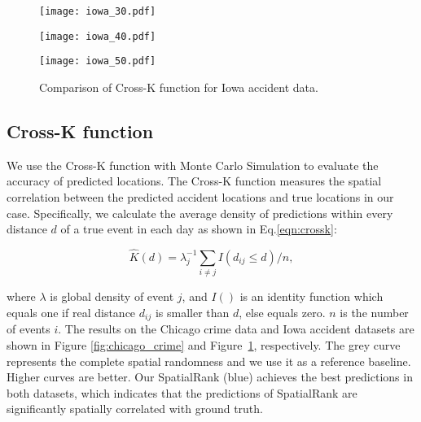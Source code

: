 \documentclass{article}
\begin{document}
{\begin{figure}
\centering
\begin{minipage}[c]{0.3\textwidth}
\centering\texttt{[image: iowa\_30.pdf]}
\end{minipage}
\begin{minipage}[c]{0.3\textwidth}
\centering\texttt{[image: iowa\_40.pdf]}
\end{minipage}
\begin{minipage}[c]{0.3\textwidth}
\centering\texttt{[image: iowa\_50.pdf]}
\end{minipage}
\caption{Comparison of Cross-K function for Iowa accident data.}
\label{fig:iowa}
\vspace{-2mm}
\end{figure}

\subsection{Cross-K function}

We use the Cross-K function\cite{doi:https://doi.org/10.1002/9781118445112.stat07751} with Monte Carlo Simulation\cite{TaoRan2019FCKa} to evaluate the accuracy of predicted locations. The Cross-K function measures the spatial correlation between the predicted accident locations and true locations in our case. Specifically, we calculate the average density of predictions within every distance $d$ of a true event in each day as shown in Eq.\ref{eqn:crossk}:


\vspace{-0.1in}
\begin{equation} \label{eqn:crossk}
\hat{K}(d) =  \lambda_j^{-1}\sum_{i \neq j}I(d_{ij} \leq d)/n,
\end{equation}

\vspace{-0.1in}
\noindent where $\lambda$ is global density of event $j$, and $I()$ is an identity function which equals one if real distance $d_{ij}$ is smaller than $d$, else equals zero. $n$ is the number of events $i$. The results on the Chicago crime data and Iowa accident datasets are shown in Figure \ref{fig:chicago_crime} and Figure~\ref{fig:iowa}, respectively. The grey curve represents the complete spatial randomness and we use it as a reference baseline. Higher curves are better. Our SpatialRank (blue) achieves the best predictions in both datasets, which indicates that the predictions of SpatialRank are significantly spatially correlated with ground truth. %


}
\end{document}
